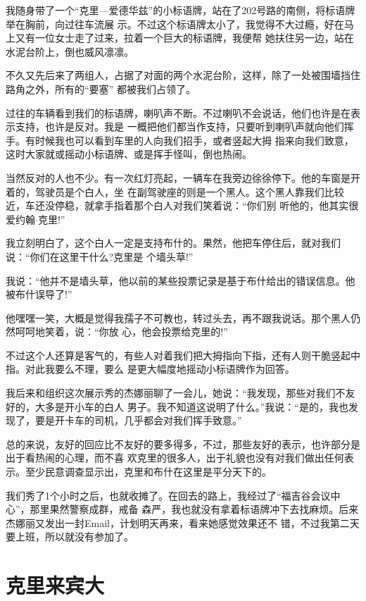 ﻿\documentclass[11pt]{article}
\begin{document}
我随身带了一个``克里---爱德华兹''的小标语牌，站在了202号路的南侧，将标语牌举在胸前，向过往车流展
示。不过这个标语牌太小了，我觉得不大过瘾，好在马上又有一位女士走了过来，拉着一个巨大的标语牌，我便帮
她扶住另一边，站在水泥台阶上，倒也威风凛凛。

不久又先后来了两组人，占据了对面的两个水泥台阶，这样，除了一处被围墙挡住路角之外，所有的``要塞''
都被我们占领了。

过往的车辆看到我们的标语牌，喇叭声不断。不过喇叭不会说话，他们也许是在表示支持，也许是反对。我是
一概把他们都当作支持，只要听到喇叭声就向他们挥手。有时候我也可以看到车里的人向我们招手，或者竖起大拇
指来向我们致意，这时大家就或摇动小标语牌、或是挥手怪叫，倒也热闹。

当然反对的人也不少。有一次红灯亮起，一辆车在我旁边徐徐停下。他的车窗是开着的，驾驶员是个白人，坐
在副驾驶座的则是一个黑人。这个黑人靠我们比较近，车还没停稳，就拿手指着那个白人对我们笑着说：``你们别
听他的，他其实很爱约翰$\cdot$克里!''

我立刻明白了，这个白人一定是支持布什的。果然，他把车停住后，就对我们说：``你们在这里干什么?克里是
个墙头草!''

我说：``他并不是墙头草，他以前的某些投票记录是基于布什给出的错误信息。他被布什误导了!''

他嘿嘿一笑，大概是觉得我孺子不可教也，转过头去，再不跟我说话。那个黑人仍然呵呵地笑着，说：``你放
心，他会投票给克里的!''

不过这个人还算是客气的，有些人对着我们把大拇指向下指，还有人则干脆竖起中指。对此我要么不理，要么
是更大幅度地摇动小标语牌作为回答。

我后来和组织这次展示秀的杰娜丽聊了一会儿，她说：``我发现，那些对我们不友好的，大多是开小车的白人
男子。我不知道这说明了什么。''我说：``是的，我也发现了，要是开卡车的司机，几乎都会对我们挥手致意。''

总的来说，友好的回应比不友好的要多得多，不过，那些友好的表示，也许部分是出于看热闹的心理，而不喜
欢克里的很多人，出于礼貌也没有对我们做出任何表示。至少民意调查显示出，克里和布什在这里是平分天下的。

我们秀了1个小时之后，也就收摊了。在回去的路上，我经过了``福吉谷会议中心''，那里果然警察成群，戒备
森严，我也就没有拿着标语牌冲下去找麻烦。后来杰娜丽又发出一封Email，计划明天再来，看来她感觉效果还不
错，不过我第二天要上班，所以就没有参加了。

\section{克里来宾大}
\end{document}

